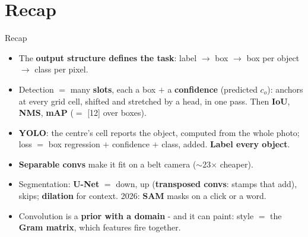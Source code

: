 \documentclass[aspectratio=169]{beamer}
\begin{document}
\section*{Recap}

\begin{frame}{Recap}
  \begin{itemize}
    \item The \textbf{output structure defines the task}: label $\to$ box $\to$ box per
      object $\to$ class per pixel.
    \item Detection $=$ many \textbf{slots}, each a box $+$ a \textbf{confidence} (predicted
      $c_o$): anchors at every grid cell, shifted and stretched by a head, in one pass. Then
      \textbf{IoU}, \textbf{NMS}, \textbf{mAP} ($=$ [12] over boxes).
    \item \textbf{YOLO}: the centre's cell reports the object, computed from the whole photo;
      loss $=$ box regression $+$ confidence $+$ class, added. \textbf{Label every object}.
    \item \textbf{Separable convs} make it fit on a belt camera ($\sim$23$\times$ cheaper).
    \item Segmentation: \textbf{U-Net} $=$ down, up (\textbf{transposed convs}: stamps that
      add), skips; \textbf{dilation} for context. 2026: \textbf{SAM} masks on a click or a word.
    \item Convolution is a \textbf{prior with a domain} - and it can paint: style $=$ the
      \textbf{Gram matrix}, which features fire together.
  \end{itemize}
  \vskip 6pt
\end{frame}
\end{document}
